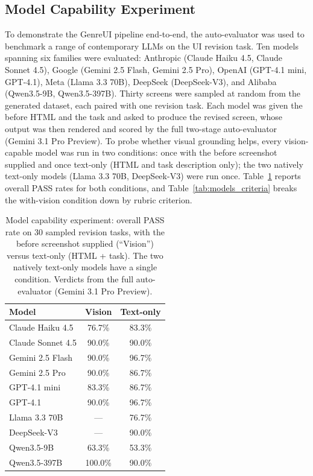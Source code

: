\documentclass[sigconf,nonacm]{acmart}
\begin{document}
\subsection{Model Capability Experiment}
\label{sec:results_models}

To demonstrate the GenreUI pipeline end-to-end, the auto-evaluator was used to benchmark a range of contemporary LLMs on the UI revision task. Ten models spanning six families were evaluated: Anthropic (Claude Haiku 4.5, Claude Sonnet 4.5), Google (Gemini 2.5 Flash, Gemini 2.5 Pro), OpenAI (GPT-4.1 mini, GPT-4.1), Meta (Llama 3.3 70B), DeepSeek (DeepSeek-V3), and Alibaba (Qwen3.5-9B, Qwen3.5-397B). Thirty screens were sampled at random from the generated dataset, each paired with one revision task. Each model was given the before HTML and the task and asked to produce the revised screen, whose output was then rendered and scored by the full two-stage auto-evaluator (Gemini 3.1 Pro Preview). To probe whether visual grounding helps, every vision-capable model was run in two conditions: once with the before screenshot supplied and once text-only (HTML and task description only); the two natively text-only models (Llama 3.3 70B, DeepSeek-V3) were run once. Table~\ref{tab:models} reports overall PASS rates for both conditions, and Table~\ref{tab:models_criteria} breaks the with-vision condition down by rubric criterion.

\begin{table}[t]
\centering
\small
\caption{Model capability experiment: overall PASS rate on 30 sampled revision tasks, with the before screenshot supplied (``Vision'') versus text-only (HTML + task). The two natively text-only models have a single condition. Verdicts from the full auto-evaluator (Gemini 3.1 Pro Preview).}
\label{tab:models}
\begin{tabular}{lcc}
\toprule
\textbf{Model} & \textbf{Vision} & \textbf{Text-only} \\
\midrule
Claude Haiku 4.5   & 76.7\%  & 83.3\% \\
Claude Sonnet 4.5  & 90.0\%  & 90.0\% \\
\addlinespace
Gemini 2.5 Flash   & 90.0\%  & 96.7\% \\
Gemini 2.5 Pro     & 90.0\%  & 86.7\% \\
\addlinespace
GPT-4.1 mini       & 83.3\%  & 86.7\% \\
GPT-4.1            & 90.0\%  & 96.7\% \\
\addlinespace
Llama 3.3 70B      & ---     & 76.7\% \\
DeepSeek-V3        & ---     & 90.0\% \\
\addlinespace
Qwen3.5-9B         & 63.3\%  & 53.3\% \\
Qwen3.5-397B       & 100.0\% & 90.0\% \\
\bottomrule
\end{tabular}
\end{table}
\end{document}
